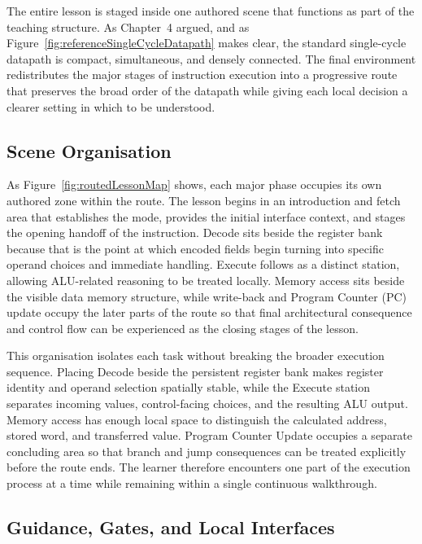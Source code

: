 The entire lesson is staged inside one authored scene that functions as part of the teaching structure. As Chapter~4 argued, and as Figure~\ref{fig:referenceSingleCycleDatapath} makes clear, the standard single-cycle datapath is compact, simultaneous, and densely connected. The final environment redistributes the major stages of instruction execution into a progressive route that preserves the broad order of the datapath while giving each local decision a clearer setting in which to be understood.

\subsection{Scene Organisation}

As Figure~\ref{fig:routedLessonMap} shows, each major phase occupies its own authored zone within the route. The lesson begins in an introduction and fetch area that establishes the mode, provides the initial interface context, and stages the opening handoff of the instruction. Decode sits beside the register bank because that is the point at which encoded fields begin turning into specific operand choices and immediate handling. Execute follows as a distinct station, allowing ALU-related reasoning to be treated locally. Memory access sits beside the visible data memory structure, while write-back and Program Counter (PC) update occupy the later parts of the route so that final architectural consequence and control flow can be experienced as the closing stages of the lesson.

This organisation isolates each task without breaking the broader execution sequence. Placing Decode beside the persistent register bank makes register identity and operand selection spatially stable, while the Execute station separates incoming values, control-facing choices, and the resulting ALU output. Memory access has enough local space to distinguish the calculated address, stored word, and transferred value. Program Counter Update occupies a separate concluding area so that branch and jump consequences can be treated explicitly before the route ends. The learner therefore encounters one part of the execution process at a time while remaining within a single continuous walkthrough.

\subsection{Guidance, Gates, and Local Interfaces}

